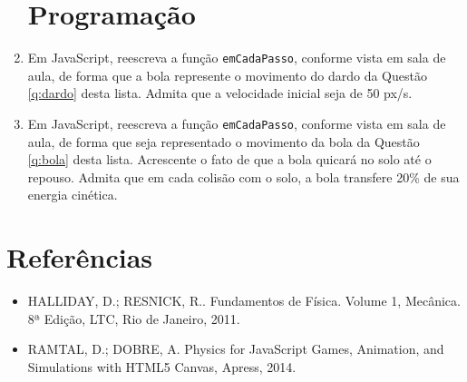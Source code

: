 \documentclass[12pt,a4paper,oneside]{article}
\begin{document}
\begin{enumerate}
\section{Programação}

	\item Em JavaScript, reescreva a função {\tt emCadaPasso}, conforme vista em sala de aula, de forma que a bola represente o movimento do dardo da Questão \ref{q:dardo} desta lista. Admita que a velocidade inicial seja de 50 px/s.
	
	\item Em JavaScript, reescreva a função {\tt emCadaPasso}, conforme vista em sala de aula, de forma que seja representado o movimento da bola da Questão \ref{q:bola} desta lista. Acrescente o fato de que a bola quicará no solo até o repouso. Admita que em cada colisão com o solo, a bola transfere 20\% de sua energia cinética.
		
\end{enumerate}

\section{Referências}

\begin{itemize}
	\item HALLIDAY, D.; RESNICK, R.. Fundamentos de Física. Volume 1, Mecânica. 8ª Edição, LTC, Rio de Janeiro, 2011.

	\item RAMTAL, D.; DOBRE, A. Physics for JavaScript Games, Animation, and Simulations with HTML5 Canvas, Apress, 2014.
\end{itemize}
\end{document}
